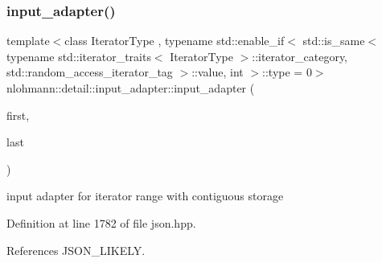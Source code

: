 \subsubsection{\texorpdfstring{input\+\_\+adapter()}{input\_adapter()}\hspace{0.1cm}{\footnotesize\ttfamily [5/7]}}
{\footnotesize\ttfamily template$<$class Iterator\+Type , typename std\+::enable\+\_\+if$<$ std\+::is\+\_\+same$<$ typename std\+::iterator\+\_\+traits$<$ Iterator\+Type $>$\+::iterator\+\_\+category, std\+::random\+\_\+access\+\_\+iterator\+\_\+tag $>$\+::value, int $>$\+::type  = 0$>$ \\
nlohmann\+::detail\+::input\+\_\+adapter\+::input\+\_\+adapter (\begin{DoxyParamCaption}\item[{Iterator\+Type}]{first,  }\item[{Iterator\+Type}]{last }\end{DoxyParamCaption})\hspace{0.3cm}{\ttfamily [inline]}}



input adapter for iterator range with contiguous storage 



Definition at line 1782 of file json.\+hpp.



References J\+S\+O\+N\+\_\+\+L\+I\+K\+E\+LY.


